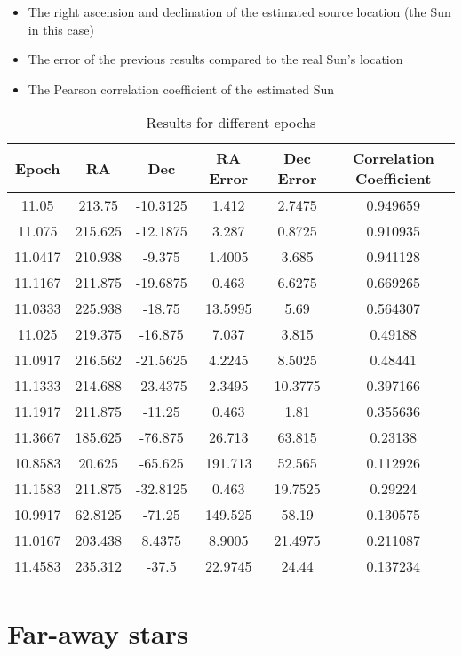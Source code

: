 \begin{itemize}
	\item The right ascension and declination of the estimated source location (the Sun in this case)
	\item The error of the previous results compared to the real Sun's location
	\item The Pearson correlation coefficient of the estimated Sun
\end{itemize}

\begin{table}[h!]
	\centering
	\def\arraystretch{1.2}
	\begin{tabular}{|c c c c c c|} 
		\hline
		\textbf{Epoch} & RA & Dec & RA Error & Dec Error & Correlation Coefficient \\ [0.5ex] 
		\hline\hline
		11.05 & 213.75 & -10.3125 & 1.412 & 2.7475 & 0.949659 \\ 
		\hline
		11.075 & 215.625 & -12.1875 & 3.287 & 0.8725 & 0.910935 \\ 
		\hline
		11.0417 & 210.938 & -9.375 & 1.4005 & 3.685 & 0.941128 \\ 
		\hline
		11.1167 & 211.875 & -19.6875 & 0.463 & 6.6275 & 0.669265 \\ 
		\hline
		11.0333 & 225.938 & -18.75 & 13.5995 & 5.69 & 0.564307 \\ 
		\hline
		11.025 & 219.375 & -16.875 & 7.037 & 3.815 & 0.49188 \\ 
		\hline
		11.0917 & 216.562 & -21.5625 & 4.2245 & 8.5025 & 0.48441 \\ 
		\hline
		11.1333 & 214.688 & -23.4375 & 2.3495 & 10.3775 & 0.397166 \\ 
		\hline
		11.1917 & 211.875 & -11.25 & 0.463 & 1.81 & 0.355636 \\ 
		\hline
		11.3667 & 185.625 & -76.875 & 26.713 & 63.815 & 0.23138 \\ 
		\hline
		10.8583 & 20.625 & -65.625 & 191.713 & 52.565 & 0.112926 \\ 
		\hline
		11.1583 & 211.875 & -32.8125 & 0.463 & 19.7525 & 0.29224 \\ 
		\hline
		10.9917 & 62.8125 & -71.25 & 149.525 & 58.19 & 0.130575 \\ 
		\hline
		11.0167 & 203.438 & 8.4375 & 8.9005 & 21.4975 & 0.211087 \\ 
		\hline
		11.4583 & 235.312 & -37.5 & 22.9745 & 24.44 & 0.137234 \\
		\hline
	\end{tabular}
	\caption{Results for different epochs}
\end{table}




\section{Far-away stars}
